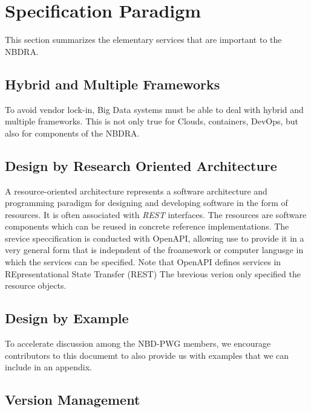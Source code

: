 \documentclass[9pt,]{article}
\begin{document}
\hypertarget{specification-paradigm}{%
\section{Specification Paradigm}\label{specification-paradigm}}

This section summarizes the elementary services that are important to
the NBDRA.

\hypertarget{hybrid-and-multiple-frameworks}{%
\subsection{Hybrid and Multiple
Frameworks}\label{hybrid-and-multiple-frameworks}}

To avoid vendor lock-in, Big Data systems must be able to deal with
hybrid and multiple frameworks. This is not only true for Clouds,
containers, DevOps, but also for components of the NBDRA.

\hypertarget{design-by-research-oriented-architecture}{%
\subsection{Design by Research Oriented
Architecture}\label{design-by-research-oriented-architecture}}

A resource-oriented architecture represents a software architecture and
programming paradigm for designing and developing software in the form
of resources. It is often associated with \emph{REST} interfaces. The
resources are software components which can be reused in concrete
reference implementations. The srevice speccification is conducted with
OpenAPI, allowing use to provide it in a very general form that is
indepndent of the froamework or computer langusge in which the services
can be specified. Note that OpenAPI defines services in REpresentational
State Transfer (REST) The brevious verion only specified the resource
objects.

\hypertarget{design-by-example}{%
\subsection{Design by Example}\label{design-by-example}}

To accelerate discussion among the NBD-PWG members, we encourage
contributors to this documemt to also provide us with examples that we
can include in an appendix.

\hypertarget{version-management}{%
\subsection{Version Management}\label{version-management}}
\end{document}

